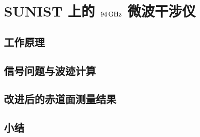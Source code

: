 \graphicspath{{figures/appendix-mi/}}

\chapter{SUNIST 上的 $94\,{\rm GHz}$ 微波干涉仪}

\section{工作原理}

\section{信号问题与波迹计算}

\section{改进后的赤道面测量结果}

\section{小结}
